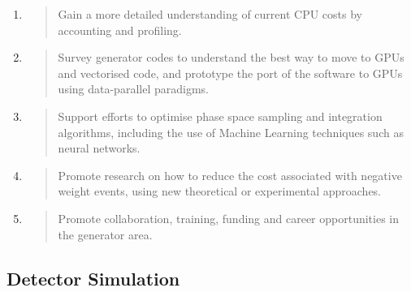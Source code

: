 \documentclass[11pt,a4paper]{article}
\begin{document}
\begin{enumerate}
\def\labelenumi{\arabic{enumi}.}
\item
  \begin{quote}
  Gain a more detailed understanding of current CPU costs by accounting
  and profiling.
  \end{quote}
\item
  \begin{quote}
  Survey generator codes to understand the best way to move to GPUs and
  vectorised code, and prototype the port of the software to GPUs using
  data-parallel paradigms.
  \end{quote}
\item
  \begin{quote}
  Support efforts to optimise phase space sampling and integration
  algorithms, including the use of Machine Learning techniques such as
  neural networks.
  \end{quote}
\item
  \begin{quote}
  Promote research on how to reduce the cost associated with negative
  weight events, using new theoretical or experimental approaches.
  \end{quote}
\item
  \begin{quote}
  Promote collaboration, training, funding and career opportunities in
  the generator area.
  \end{quote}
\end{enumerate}

\hypertarget{detector-simulation-1}{%
\subsection{Detector Simulation}\label{detector-simulation-1}}
\end{document}
